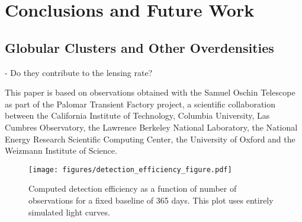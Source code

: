 \documentclass[12pt,preprint]{aastex}
\begin{document}
\section{Conclusions and Future Work}
\subsection{Globular Clusters and Other Overdensities}
- Do they contribute to the lensing rate?

\acknowledgments
This paper is based on observations obtained with the Samuel Oschin Telescope as part of the Palomar Transient Factory project, a scientific collaboration between the California Institute of Technology, Columbia University, Las Cumbres Observatory, the Lawrence Berkeley National Laboratory, the National Energy Research Scientific Computing Center, the University of Oxford and the Weizmann Institute of Science.

\clearpage
\setlength{\baselineskip}{0.6\baselineskip}

\setlength{\baselineskip}{1.667\baselineskip}


%
%
%
\begin{figure}
	\centering
	\caption{Computed detection efficiency as a function of number of observations for a fixed baseline of 365 days. This plot uses entirely simulated light curves.}
    \texttt{[image: figures/detection\_efficiency\_figure.pdf]}
    \label{fig:survey_footprint}
\end{figure}	
%
%
%
\end{document}

